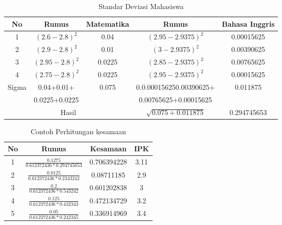 \begin{enumerate}
    \begin{table}[H]
        \centering
        \renewcommand{\arraystretch}{1.5}
        \begin{tabular}{|c|c|c|c|c|}
    		\hline
    		No & Rumus & Matematika & Rumus & Bahasa Inggris\\
    		\hline
    		1 & $(2.6-2.8)^2$ & 0.04 & $(2.95-2.9375)^2$ & 0.00015625 \\
    		\hline
    		2 & $(2.9-2.8)^2$ & 0.01 & $(3-2.9375)^2$ & 0.00390625 \\
    		\hline
    		3 & $(2.95-2.8)^2$ & 0.0225 & $(2.85-2.9375)^2$ & 0.00765625 \\
    		\hline
    		4 & $(2.75-2.8)^2$ & 0.0225 & $(2.95-2.9375)^2$ & 0.00015625
     \\
    		\hline
    		\multirow{2}{*}{Sigma} & 0.04+0.01+ & 0.075 & 0.0.000156250.00390625+ & 0.011875\\
    		& 0.0225+0.0225 & & 0.00765625+0.00015625 & \\
    		\hline
    		\multicolumn{3}{|c|}{Hasil} & $\sqrt{0.075+0.011875}$ & 0.294745653	 \\
    		\hline
        \end{tabular}
        \caption{Standar Deviasi Mahasiswa}
    	\label{tab:sd_mahasiswa}
    \end{table}
    
    \begin{table}[H]
        \centering
        \renewcommand{\arraystretch}{1.5}
        \begin{tabular}{|c|c|c|c|}
            \hline
            No & Rumus & Kesamaan & IPK \\ 
            \hline
            1 & $\frac{0.1275}{0.612372436*0.294745653}$ & 0.706394228 & 3.11\\
            \hline
            2 & $\frac{0.0125}{0.612372436*0.2343242}$ & 0.08711185 & 2.9 \\
            \hline
            3 & $\frac{0.2}{0.612372436*0.543242}$ & 0.601202838 & 3 \\
            \hline
            4 & $\frac{0.125}{0.612372436*0.432343}$ & 0.472134729 & 3.2\\
            \hline
            5 & $\frac{0.05}{0.612372436*0.242345}$ & 0.336914969 & 3.4\\
            \hline
        \end{tabular}
        \caption{Contoh Perhitungan kesamaan}
        \label{tab:kesamaan}
    \end{table}
    

\end{enumerate}
